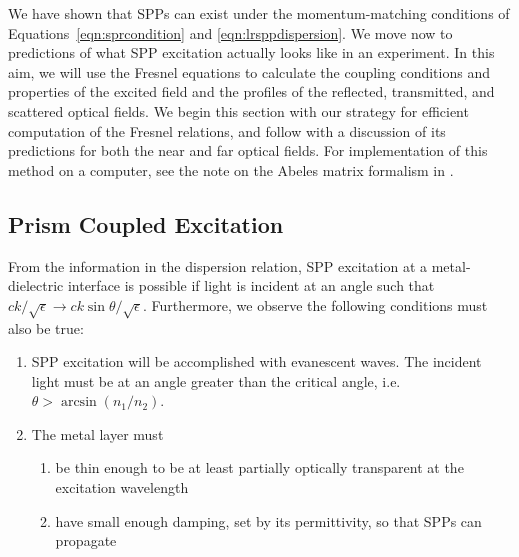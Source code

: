 We have shown that SPPs can exist under the momentum-matching conditions of
Equations~\ref{eqn:sprcondition} and \ref{eqn:lrsppdispersion}.  We move
now to predictions of what SPP excitation actually looks like in an
experiment.  In this aim, we will use the Fresnel equations to calculate
the coupling conditions and properties of the excited field and the
profiles of the reflected, transmitted, and scattered optical fields.   We
begin this section with our strategy for efficient computation of the
Fresnel relations, and follow with a discussion of its predictions for both
the near and far optical fields.  For implementation of this method on a
computer, see the note on the Abeles matrix formalism in
.

\subsection{Prism Coupled Excitation}
From the information in the dispersion relation, SPP excitation at a
metal-dielectric interface is possible if light is incident at an angle such
that  $ck/\sqrt{\epsilon} \to ck\sin\theta/\sqrt{\epsilon}$.  Furthermore, we observe the following
conditions must also be true:
\begin{enumerate}
\item SPP excitation will be accomplished with evanescent waves.  The
incident light must be at an angle greater than the critical angle, i.e.
$\theta>\arcsin\left(n_1/n_2\right)$.
\item The metal layer must
\begin{enumerate}
\item be thin enough to be at least partially optically transparent at the excitation wavelength
\item have small enough damping, set by its permittivity, so that SPPs can propagate
\end{enumerate}
\end{enumerate}

